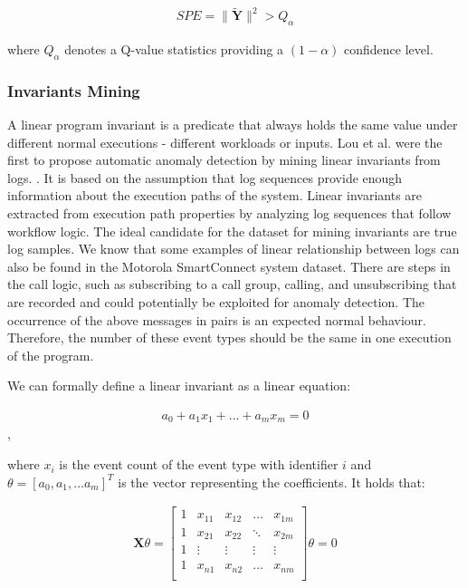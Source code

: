 \begin{gather}
    SPE = \parallel \mathbf{\widetilde{Y}} \parallel^2 > Q_{\alpha} 
\end{gather}
 
where $Q_{\alpha}$ denotes a Q-value statistics providing a $(1 - \alpha)$ confidence level. 

\subsubsection{Invariants Mining}
\label{section:lrInvariantMining}
 
A linear program invariant is a predicate that always holds the same value under different normal executions - different workloads or inputs. Lou et al. were the first to propose automatic anomaly detection by mining linear invariants from logs. \cite{lou2010}. It is based on the assumption that log sequences provide enough information about the execution paths of the system. Linear invariants are extracted from execution path properties by analyzing log sequences that follow workflow logic. The ideal candidate for the dataset for mining invariants are true log samples. We know that some examples of linear relationship between logs can also be found in the Motorola SmartConnect system dataset. 
There are steps in the call logic, such as subscribing to a call group, calling, and unsubscribing that are recorded and could potentially be exploited for anomaly detection. The occurrence of the above messages in pairs is an expected normal behaviour. Therefore, the number of these event types should be the same in one execution of the program. 

We can formally define a linear invariant as a linear equation:

\begin{gather}
    a_0 + a_1 x_1 + ... + a_m x_m = 0
\end{gather},

where $x_i$ is the event count of the event type with identifier $i$ and $\theta = [a_0, a_1, ... a_m]^T$ is the vector representing the coefficients. It holds that: 

\begin{gather}
\mathbf{X} \theta = 
\begin{bmatrix}
1 & x_{11} & x_{12} & \hdots & x_{1m}\\
1 & x_{21} & x_{22} & \ddots & x_{2m}\\
1 & \vdots & \vdots & \vdots &\vdots \\
1 & x_{n1} & x_{n2} & \hdots & x_{nm}\\
\end{bmatrix}
\theta = 0
\end{gather}

